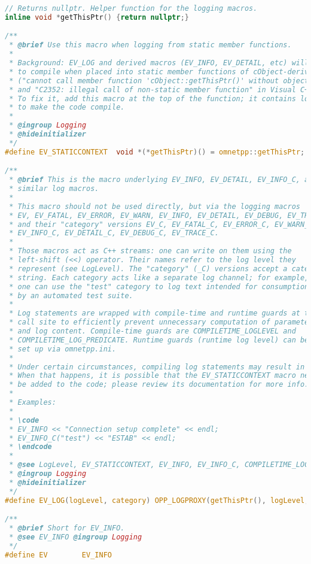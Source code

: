 \begin{lstlisting}[language=c]
// Returns nullptr. Helper function for the logging macros.
inline void *getThisPtr() {return nullptr;}

/**
 * @brief Use this macro when logging from static member functions.
 *
 * Background: EV_LOG and derived macros (EV_INFO, EV_DETAIL, etc) will fail
 * to compile when placed into static member functions of cObject-derived classes
 * ("cannot call member function 'cObject::getThisPtr()' without object" in GNU C++,
 * and "C2352: illegal call of non-static member function" in Visual C++).
 * To fix it, add this macro at the top of the function; it contains local declarations
 * to make the code compile.
 *
 * @ingroup Logging
 * @hideinitializer
 */
#define EV_STATICCONTEXT  void *(*getThisPtr)() = omnetpp::getThisPtr;

/**
 * @brief This is the macro underlying EV_INFO, EV_DETAIL, EV_INFO_C, and
 * similar log macros.
 *
 * This macro should not be used directly, but via the logging macros
 * EV, EV_FATAL, EV_ERROR, EV_WARN, EV_INFO, EV_DETAIL, EV_DEBUG, EV_TRACE,
 * and their "category" versions EV_C, EV_FATAL_C, EV_ERROR_C, EV_WARN_C,
 * EV_INFO_C, EV_DETAIL_C, EV_DEBUG_C, EV_TRACE_C.
 *
 * Those macros act as C++ streams: one can write on them using the
 * left-shift (<<) operator. Their names refer to the log level they
 * represent (see LogLevel). The "category" (_C) versions accept a category
 * string. Each category acts like a separate log channel; for example,
 * one can use the "test" category to log text intended for consumption
 * by an automated test suite.
 *
 * Log statements are wrapped with compile-time and runtime guards at the
 * call site to efficiently prevent unnecessary computation of parameters
 * and log content. Compile-time guards are COMPILETIME_LOGLEVEL and
 * COMPILETIME_LOG_PREDICATE. Runtime guards (runtime log level) can be
 * set up via omnetpp.ini.
 *
 * Under certain circumstances, compiling log statements may result in errors.
 * When that happens, it is possible that the EV_STATICCONTEXT macro needs to
 * be added to the code; please review its documentation for more info.
 *
 * Examples:
 *
 * \code
 * EV_INFO << "Connection setup complete" << endl;
 * EV_INFO_C("test") << "ESTAB" << endl;
 * \endcode
 *
 * @see LogLevel, EV_STATICCONTEXT, EV_INFO, EV_INFO_C, COMPILETIME_LOGLEVEL, COMPILETIME_LOG_PREDICATE
 * @ingroup Logging
 * @hideinitializer
 */
#define EV_LOG(logLevel, category) OPP_LOGPROXY(getThisPtr(), logLevel, category).getStream()

/**
 * @brief Short for EV_INFO.
 * @see EV_INFO @ingroup Logging
 */
#define EV        EV_INFO


\end{lstlisting}

